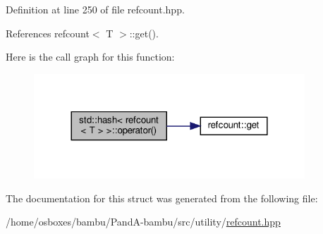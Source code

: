 Definition at line 250 of file refcount.\+hpp.



References refcount$<$ T $>$\+::get().

Here is the call graph for this function\+:
\nopagebreak
\begin{figure}[H]
\begin{center}
\leavevmode
\includegraphics[width=288pt]{d6/d23/structstd_1_1hash_3_01refcount_3_01T_01_4_01_4_a9c7265bc31a55e60310de3d145fd5611_cgraph}
\end{center}
\end{figure}


The documentation for this struct was generated from the following file\+:\begin{DoxyCompactItemize}
\item 
/home/osboxes/bambu/\+Pand\+A-\/bambu/src/utility/\hyperlink{refcount_8hpp}{refcount.\+hpp}\end{DoxyCompactItemize}
